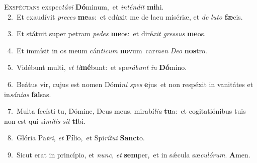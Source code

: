 \lettrine{\initial\textcolor{\initialcolor}{E}}{xspéctans} exspec\-\textit{tá}\-\textit{vi} \textbf{Dó}\-minum,~\star et \textit{in}\-\textit{tén}\textit{dit} \textbf{mi}\-hi.\\
{\numbfont\textcolor{\numbcolor}{~2.}}~Et exaudívit \textit{pre}\-\textit{ces} \textbf{me}\-as:~\star et edúxit me de lacu misériæ, et \textit{de} \textit{lu}\-\textit{to} \textbf{fæ}\-cis.\par
{\numbfont\textcolor{\numbcolor}{~3.}}~Et státuit super petram \textit{pe}\-\textit{des} \textbf{me}\-os:~\star et diré\textit{xit} \textit{gres}\-\textit{sus} \textbf{me}\-os.\par
{\numbfont\textcolor{\numbcolor}{~4.}}~Et immísit in os meum cán\-\textit{ti}\-\textit{cum} \textbf{no}\-vum~\star car\textit{men} \textit{De}\-\textit{o} \textbf{nos}\-tro.\par
{\numbfont\textcolor{\numbcolor}{~5.}}~Vidébunt multi, \textit{et} \textit{ti}\-\textbf{mé}bunt:~\star et spe\-\textit{rá}\-\textit{bunt} \textit{in} \textbf{Dó}\-mino.\par
{\numbfont\textcolor{\numbcolor}{~6.}}~Beátus vir, cujus est nomen Dómi\textit{ni} \textit{spes} \textbf{e}\-jus~\star et non respéxit in vanitátes et in\-\textit{sá}\-\textit{ni}\textit{as} \textbf{fal}\-sas.\par
{\numbfont\textcolor{\numbcolor}{~7.}}~Multa fecísti tu, Dómine, Deus meus, mirabí\-\textit{li}\-\textit{a} \textbf{tu}\-a:~\star et cogitatiónibus tuis non est qui sí\-\textit{mi}\-\textit{lis} \textit{sit} \textbf{ti}\-bi.\par
{\numbfont\textcolor{\numbcolor}{~8.}}~Glória Pa\-\textit{tri}\-, \textit{et} \textbf{Fí}\-lio,~\star et Spi\-\textit{rí}\-\textit{tu}\textit{i} \textbf{Sanc}\-to.\par
{\numbfont\textcolor{\numbcolor}{~9.}}~Sicut erat in princípio, et \textit{nunc}\-, \textit{et} \textbf{sem}\-per,~\star et in sǽcula sæ\-\textit{cu}\-\textit{ló}\textit{rum}. \textbf{A}\-men.\par
